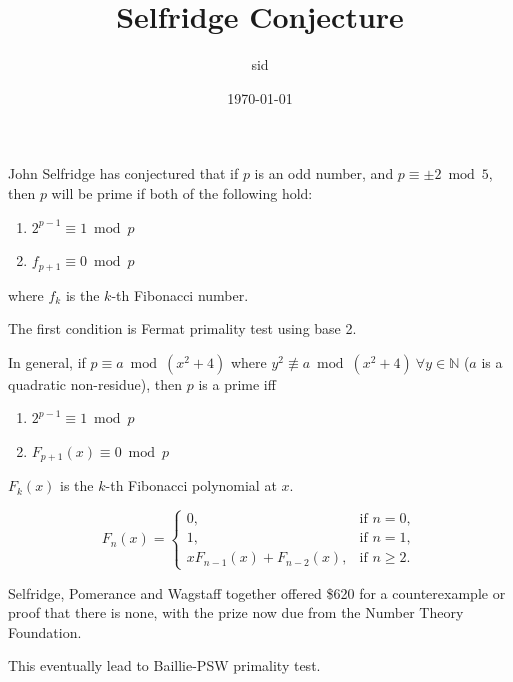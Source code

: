 \documentclass{article}
\title{Selfridge Conjecture}
\author{sid}
\date{\today}
\newcommand{\N}{\mathbb{N}}
\begin{document}
\maketitle

John Selfridge has conjectured that if $p$ is an odd number, and  $p\equiv\pm2\bmod{5}$, then $p$ will be prime if both of the following hold:
\begin{enumerate}
  \item $2^{p-1}\equiv1\bmod{p}$
  \item $f_{p+1}\equiv0\bmod{p}$
\end{enumerate}
where $f_k$ is the $k$-th Fibonacci number.

The first condition is Fermat primality test using base 2.

\hrulefill

In general, if $p\equiv{a\bmod{(x^2+4)}}$ where $y^2\not\equiv{a\bmod{(x^2+4)}}\ \forall{y\in\N}$ ($a$ is a quadratic non-residue), then $p$ is a prime iff
\begin{enumerate}
  \item $2^{p-1}\equiv{1\bmod{p}}$
  \item $F_{p+1}(x)\equiv{0\bmod{p}}$
\end{enumerate}
$F_{k}(x)$ is the $k$-th Fibonacci polynomial at $x$.

$$
F_n(x) =
\begin{cases}
0, & \text{if } n = 0, \\
1, & \text{if } n = 1, \\
x F_{n-1}(x) + F_{n-2}(x), & \text{if } n \geq 2.
\end{cases}
$$

Selfridge, Pomerance and Wagstaff together offered \$620 for a counterexample or proof that there is none, with the prize now due from the Number Theory Foundation.

This eventually lead to Baillie-PSW primality test.
\end{document}

